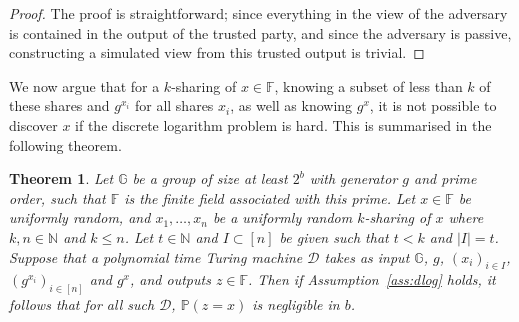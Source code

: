 \documentclass{article}
\newcommand{\seq}[1]{\left[#1\right]}
\newtheorem{theorem}{Theorem}
\theoremstyle{remark}
\newcommand{\N}{\mathbb{N}}
\newcommand{\F}{\mathbb{F}}
\newcommand{\G}{\mathbb{G}}
\renewcommand{\P}{\mathbb{P}}
\begin{document}
\begin{proof}
	The proof is straightforward; since everything in the view of the adversary
	is contained in the output of the trusted party, and since the adversary is
	passive, constructing a simulated view from this trusted output is trivial.
\end{proof}

We now argue that for a $k$-sharing of $x \in \F$, knowing a subset of less
than $k$ of these shares and $g^{x_i}$ for all shares $x_i$, as well as knowing
$g^x$, it is not possible to discover $x$ if the discrete logarithm problem is
hard. This is summarised in the following theorem.

\begin{theorem}
	Let $\G$ be a group of size at least $2^b$ with generator $g$ and prime
	order, such that $\F$ is the finite field associated with this prime. Let
	$x \in \F$ be uniformly random, and $x_1, \ldots, x_n$ be a uniformly
	random $k$-sharing of $x$ where $k, n \in \N$ and $k \le n$. Let $t \in \N$
	and $I \subset \seq{n}$ be given such that $t < k $ and $|I| = t$. Suppose
	that a polynomial time Turing machine $\mathcal{D}$ takes as input $\G$,
	$g$, ${(x_i)}_{i \in I}$, ${(g^{x_i})}_{i \in \seq{n}}$ and $g^x$, and
	outputs $z \in \F$. Then if Assumption~\ref{ass:dlog} holds, it follows
	that for all such $\mathcal{D}$, $\P(z = x)$ is negligible in $b$.
\end{theorem}
\end{document}
